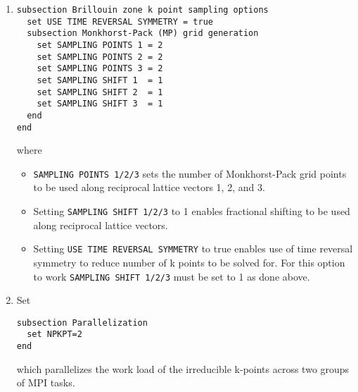 \begin{enumerate}
\item 
\begin{verbatim}
subsection Brillouin zone k point sampling options
  set USE TIME REVERSAL SYMMETRY = true
  subsection Monkhorst-Pack (MP) grid generation
    set SAMPLING POINTS 1 = 2
    set SAMPLING POINTS 2 = 2
    set SAMPLING POINTS 3 = 2
    set SAMPLING SHIFT 1  = 1
    set SAMPLING SHIFT 2  = 1
    set SAMPLING SHIFT 3  = 1
  end
end
\end{verbatim}
where
\begin{itemize}
\item \verb|SAMPLING POINTS 1/2/3| sets the number of Monkhorst-Pack grid points to be used along reciprocal lattice
vectors 1, 2, and 3.  		
\item Setting \verb|SAMPLING SHIFT 1/2/3| to 1 enables fractional shifting to be used along reciprocal lattice vectors.
\item Setting \verb|USE TIME REVERSAL SYMMETRY| to true enables use of time reversal symmetry to reduce number of k points to be solved for. For this option to work  \verb|SAMPLING SHIFT 1/2/3| must be set to 1 as done above. 
\end{itemize}

\item Set 
\begin{verbatim}	
subsection Parallelization
  set NPKPT=2
end
\end{verbatim}
which parallelizes the work load of the irreducible k-points across two groups of MPI tasks.


\end{enumerate}
